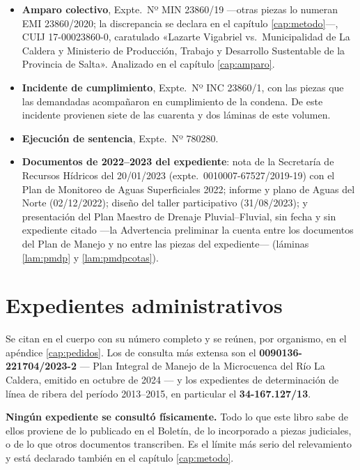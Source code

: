\begin{itemize}[leftmargin=*]
\item \textbf{Amparo colectivo}, Expte.\ Nº MIN 23860/19 ---otras piezas lo numeran EMI 23860/2020; la discrepancia se declara en el capítulo \ref{cap:metodo}---, CUIJ 17-00023860-0, caratulado
«Lazarte Vigabriel vs.\ Municipalidad de La Caldera y Ministerio de Producción, Trabajo y
Desarrollo Sustentable de la Provincia de Salta». Analizado en el capítulo \ref{cap:amparo}.
\item \textbf{Incidente de cumplimiento}, Expte.\ Nº INC 23860/1, con las piezas que las
demandadas acompañaron en cumplimiento de la condena. De este incidente provienen siete de las cuarenta y dos láminas de este volumen.
\item \textbf{Ejecución de sentencia}, Expte.\ Nº 780280.
\item \textbf{Documentos de 2022--2023 del expediente}: nota de la Secretaría de Recursos Hídricos del 20/01/2023 (expte.\ 0010007-67527/2019-19) con el Plan de Monitoreo de Aguas Superficiales 2022; informe y plano de Aguas del Norte (02/12/2022); diseño del taller participativo (31/08/2023); y presentación del Plan Maestro de Drenaje Pluvial--Fluvial, sin fecha y sin expediente citado ---la Advertencia preliminar la cuenta entre los documentos del Plan de Manejo y no entre las piezas del expediente--- (láminas \ref{lam:pmdp} y \ref{lam:pmdpcotas}).
\end{itemize}

\section{Expedientes administrativos}

Se citan en el cuerpo con su número completo y se reúnen, por organismo, en el apéndice
\ref{cap:pedidos}. Los de consulta más extensa son el \textbf{0090136-221704/2023-2} ---
Plan Integral de Manejo de la Microcuenca del Río La Caldera, emitido en octubre de 2024 ---
y los expedientes de determinación de línea de ribera del período 2013--2015, en particular
el \textbf{34-167.127/13}.

\begin{cautela}
\textbf{Ningún expediente se consultó físicamente.} Todo lo que este libro sabe de ellos
proviene de lo publicado en el Boletín, de lo incorporado a piezas judiciales, o de lo que
otros documentos transcriben. Es el límite más serio del relevamiento y está declarado
también en el capítulo \ref{cap:metodo}.
\end{cautela}

